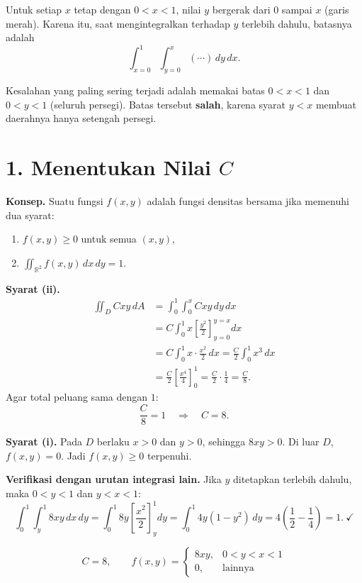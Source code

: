 \documentclass[11pt,a4paper]{article}
\begin{document}
Untuk setiap $x$ tetap dengan $0<x<1$, nilai $y$ bergerak dari $0$ sampai $x$ (garis merah). Karena itu, saat mengintegralkan terhadap $y$ terlebih dahulu, batasnya adalah
\[
\int_{x=0}^{1}\int_{y=0}^{x} (\cdots)\,dy\,dx.
\]

\begin{catatan}
Kesalahan yang paling sering terjadi adalah memakai batas $0<x<1$ dan $0<y<1$ (seluruh persegi). Batas tersebut \textbf{salah}, karena syarat $y<x$ membuat daerahnya hanya setengah persegi.
\end{catatan}

\section*{1. Menentukan Nilai $C$}

\textbf{Konsep.} Suatu fungsi $f(x,y)$ adalah fungsi densitas bersama jika memenuhi dua syarat:
\begin{enumerate}[label=(\roman*)]
  \item $f(x,y)\ge 0$ untuk semua $(x,y)$,
  \item $\displaystyle\iint_{\mathbb{R}^2} f(x,y)\,dx\,dy = 1$.
\end{enumerate}

\textbf{Syarat (ii).}
\begin{align*}
\iint_D Cxy\,dA
&= \int_0^1\int_0^x Cxy\,dy\,dx \\[4pt]
&= C\int_0^1 x\left[\frac{y^2}{2}\right]_{y=0}^{y=x} dx \\[4pt]
&= C\int_0^1 x\cdot\frac{x^2}{2}\,dx
 = \frac{C}{2}\int_0^1 x^3\,dx \\[4pt]
&= \frac{C}{2}\left[\frac{x^4}{4}\right]_0^1
 = \frac{C}{2}\cdot\frac14
 = \frac{C}{8}.
\end{align*}
Agar total peluang sama dengan $1$:
\[
\frac{C}{8}=1 \quad\Longrightarrow\quad C=8.
\]

\textbf{Syarat (i).} Pada $D$ berlaku $x>0$ dan $y>0$, sehingga $8xy>0$. Di luar $D$, $f(x,y)=0$. Jadi $f(x,y)\ge 0$ terpenuhi.

\textbf{Verifikasi dengan urutan integrasi lain.} Jika $y$ ditetapkan terlebih dahulu, maka $0<y<1$ dan $y<x<1$:
\[
\int_0^1\int_y^1 8xy\,dx\,dy
= \int_0^1 8y\left[\frac{x^2}{2}\right]_y^1 dy
= \int_0^1 4y(1-y^2)\,dy
= 4\left(\frac12-\frac14\right)=1.\ \checkmark
\]

\begin{jawaban}
\[
C = 8, \qquad
f(x,y)=\begin{cases} 8xy, & 0<y<x<1\\ 0, & \text{lainnya}\end{cases}
\]
\end{jawaban}
\end{document}
